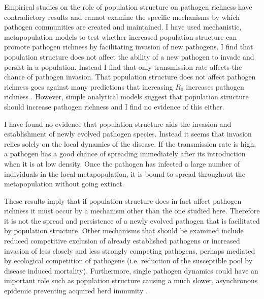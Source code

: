 
Empirical studies on the role of population structure on pathogen richness have contradictory results \cite{maganga2014bat, turmelle2009correlates, gay2014parasite} and cannot examine the specific mechanisms by which pathogen communities are created and maintained.
I have used mechanistic, metapopulation models to test whether increased population structure can promote pathogen richness by facilitating invasion of new pathogens.
I find that population structure does not affect the ability of a new pathogen to invade and persist in a population.
Instead I find that only transmission rate affects the chance of pathogen invasion.
That population structure does not affect pathogen richness goes against many predictions that increasing $R_0$ increases pathogen richness \cite{nunn2003comparative, morand2000wormy, poulin2014parasite, poulin2000diversity, altizer2003social}.
However, simple analytical models suggest that population structure should increase pathogen richness \cite{qiu2013vector, allen2004sis, nunes2006localized} and I find no evidence of this either.

I have found no evidence that population structure aids the invasion and establishment of newly evolved pathogen species.
Instead it seems that invasion relies solely on the local dynamics of the disease.
If the transmission rate is high, a pathogen has a good chance of spreading immediately after its introduction when it is at low density.
Once the pathogen has infected a large number of individuals in the local metapopulation, it is bound to spread throughout the metapopulation without going extinct.


These results imply that if population structure does in fact affect pathogen richness \cite{maganga2014bat, turmelle2009correlates, gay2014parasite} it must occur by a mechanism other than the one studied here.
Therefore it is not the spread and persistence of a newly evolved pathogen that is facilitated by population structure.
Other mechanisms that should be examined include reduced competitive exclusion of already established pathogens or increased invasion of less closely and less strongly competing pathogens, perhaps mediated by ecological competition of pathogens (i.e. reduction of the susceptible pool by disease induced mortality).
Furthermore, single pathogen dynamics could have an important role such as population structure causing a much slower, asynchronous epidemic preventing acquired herd immunity \cite{plowright2011urban}.

